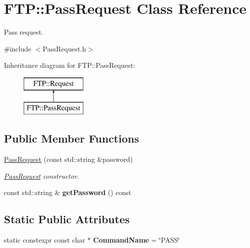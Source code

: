 \hypertarget{classFTP_1_1PassRequest}{}\section{F\+T\+P\+:\+:Pass\+Request Class Reference}
\label{classFTP_1_1PassRequest}


Pass request.  




{\ttfamily \#include $<$Pass\+Request.\+h$>$}

Inheritance diagram for F\+T\+P\+:\+:Pass\+Request\+:\begin{figure}[H]
\begin{center}
\leavevmode
\includegraphics[height=2.000000cm]{classFTP_1_1PassRequest}
\end{center}
\end{figure}
\subsection*{Public Member Functions}
\begin{DoxyCompactItemize}
\item 
\hyperlink{classFTP_1_1PassRequest_a4eb653d4dfd503f9389f5307dd3b802c}{Pass\+Request} (const std\+::string \&password)
\begin{DoxyCompactList}\small\item\em \hyperlink{classFTP_1_1PassRequest}{Pass\+Request} constructor. \end{DoxyCompactList}\item 
\hypertarget{classFTP_1_1PassRequest_a43b1f3a580fc4492cb90713b9a79e537}{}const std\+::string \& {\bfseries get\+Password} () const \label{classFTP_1_1PassRequest_a43b1f3a580fc4492cb90713b9a79e537}

\end{DoxyCompactItemize}
\subsection*{Static Public Attributes}
\begin{DoxyCompactItemize}
\item 
\hypertarget{classFTP_1_1PassRequest_a17183488e2afd35b11bb970f113e7807}{}static constexpr const char $\ast$ {\bfseries Command\+Name} = \char`\"{}P\+A\+S\+S\char`\"{}\label{classFTP_1_1PassRequest_a17183488e2afd35b11bb970f113e7807}

\end{DoxyCompactItemize}


